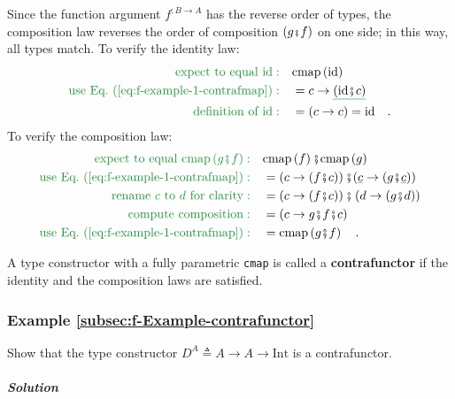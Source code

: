 \noindent Since the function argument $f^{:B\rightarrow A}$ has the
reverse order of types, the composition law reverses the order of
composition $\left(g\bef f\right)$ on one side; in this way, all
types match. To verify the identity law:
\begin{align*}
{\color{greenunder}\text{expect to equal }\text{id}:}\quad & \text{cmap}\left(\text{id}\right)\\
{\color{greenunder}\text{use Eq.~(\ref{eq:f-example-1-contrafmap})}:}\quad & =c\rightarrow\gunderline{(\text{id}\bef c)}\\
{\color{greenunder}\text{definition of }\text{id}:}\quad & =\left(c\rightarrow c\right)=\text{id}\quad.
\end{align*}
To verify the composition law:
\begin{align*}
{\color{greenunder}\text{expect to equal }\text{cmap}\left(g\bef f\right):}\quad & \text{cmap}\left(f\right)\bef\text{cmap}\left(g\right)\\
{\color{greenunder}\text{use Eq.~(\ref{eq:f-example-1-contrafmap})}:}\quad & =\left(c\rightarrow(f\bef c)\right)\bef(\gunderline c\rightarrow(g\bef\gunderline c))\\
{\color{greenunder}\text{rename }c\text{ to }d\text{ for clarity}:}\quad & =\left(c\rightarrow(f\bef c)\right)\bef\left(d\rightarrow(g\bef d)\right)\\
{\color{greenunder}\text{compute composition}:}\quad & =\left(c\rightarrow g\bef f\bef c\right)\\
{\color{greenunder}\text{use Eq.~(\ref{eq:f-example-1-contrafmap})}:}\quad & =\text{cmap}\left(g\bef f\right)\quad.
\end{align*}

A type constructor with a fully parametric \lstinline!cmap! is called
a \textbf{contrafunctor} if the identity and
the composition laws are satisfied.

\subsubsection{Example \label{subsec:f-Example-contrafunctor}\ref{subsec:f-Example-contrafunctor}}

Show that the type constructor $D^{A}\triangleq A\rightarrow A\rightarrow\text{Int}$
is a contrafunctor.

\subparagraph{Solution}

